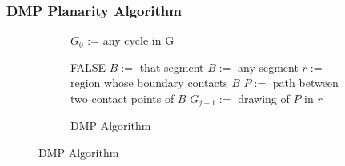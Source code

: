 \documentclass{beamer}
\begin{document}
    \frame
    {
        \frametitle{DMP Planarity Algorithm}
        \begin{figure}
            \centering
            \SetCustomAlgoRuledWidth{5.5cm}
            \tiny
            \begin{subfigure}[h]{5.5cm} 
                \begin{algorithm}[H]
                    \NoCaptionOfAlgo
                    \DontPrintSemicolon
                        $G_0$ := any cycle in G \;
                        
                        {
                            {
                                \Return FALSE \;
                            }
                            {
                                $B :=$ that segment \;
                            }
                            \Else
                            {
                                $B :=$ any segment \;
                            }
                            $r :=$ region whose boundary contacts $B$ \;
                            $P :=$ path between two contact points of $B$ \;
                            $G_{j+1} :=$ drawing of $P$ in $r$ \;
                        }
                    
                    \caption{\tiny DMP Algorithm}
                \end{algorithm}
            \end{subfigure}
        \end{figure}
        \vfill
    }
    
\end{document}
